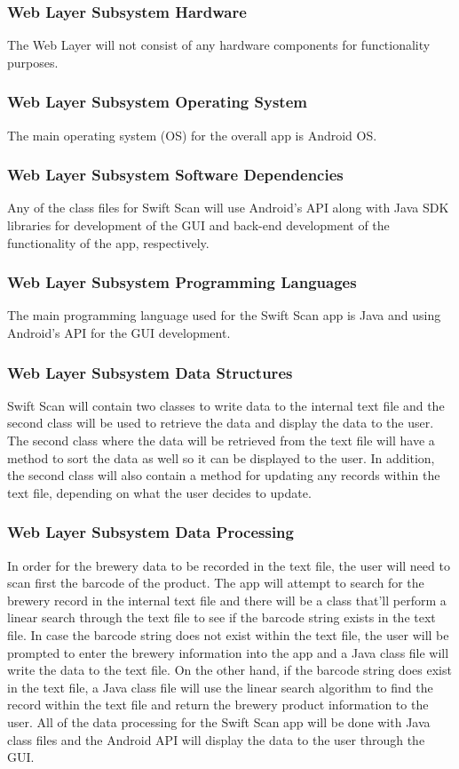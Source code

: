 \subsubsection{Web Layer Subsystem Hardware}
The Web Layer will not consist of any hardware components for functionality purposes.

\subsubsection{Web Layer Subsystem Operating System}
The main operating system (OS) for the overall app is Android OS.

\subsubsection{Web Layer Subsystem Software Dependencies}
Any of the class files for Swift Scan will use Android's API along with Java SDK libraries for development of the GUI and back-end development of the functionality of the app, respectively.

\subsubsection{Web Layer Subsystem Programming Languages}
The main programming language used for the Swift Scan app is Java and using Android's API for the GUI development.

\subsubsection{Web Layer Subsystem Data Structures}
Swift Scan will contain two classes to write data to the internal text file and the second class will be used to retrieve the data and display the data to the user.  The second class where the data will be retrieved from the text file will have a method to sort the data as well so it can be displayed to the user.  In addition, the second class will also contain a method for updating any records within the text file, depending on what the user decides to update.

\subsubsection{Web Layer Subsystem Data Processing}
In order for the brewery data to be recorded in the text file, the user will need to scan first the barcode of the product.  The app will attempt to search for the brewery record in the internal text file and there will be a class that'll perform a linear search through the text file to see if the barcode string exists in the text file.  In case the barcode string does not exist within the text file, the user will be prompted to enter the brewery information into the app and a Java class file will write the data to the text file.  On the other hand, if the barcode string does exist in the text file, a Java class file will use the linear search algorithm to find the record within the text file and return the brewery product information to the user.  All of the data processing for the Swift Scan app will be done with Java class files and the Android API will display the data to the user through the GUI.
